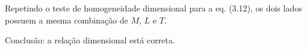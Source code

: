 Repetindo o teste de homogeneidade dimensional para a eq. (3.12), os dois lados possuem a mesma combinação de $M$, $L$ e $T$.

Conclusão: a relação dimensional está correta.


